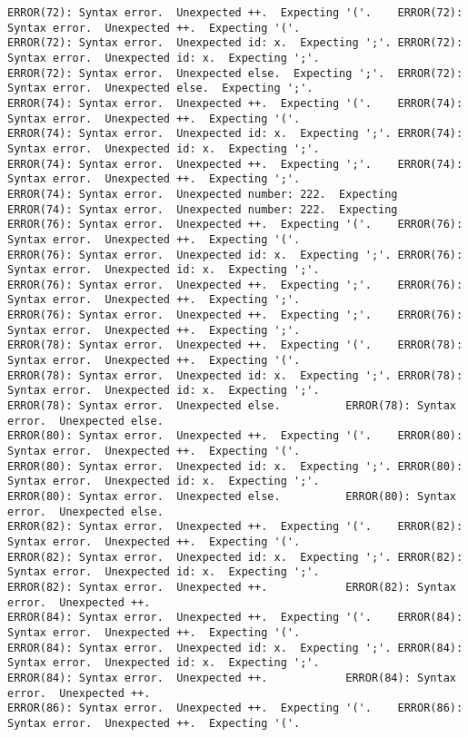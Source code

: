 \documentclass[12pt]{book}
\begin{document}
\begin{lstlisting}
ERROR(72): Syntax error.  Unexpected ++.  Expecting '('.	ERROR(72): Syntax error.  Unexpected ++.  Expecting '('.
ERROR(72): Syntax error.  Unexpected id: x.  Expecting ';'.	ERROR(72): Syntax error.  Unexpected id: x.  Expecting ';'.
ERROR(72): Syntax error.  Unexpected else.  Expecting ';'.	ERROR(72): Syntax error.  Unexpected else.  Expecting ';'.
ERROR(74): Syntax error.  Unexpected ++.  Expecting '('.	ERROR(74): Syntax error.  Unexpected ++.  Expecting '('.
ERROR(74): Syntax error.  Unexpected id: x.  Expecting ';'.	ERROR(74): Syntax error.  Unexpected id: x.  Expecting ';'.
ERROR(74): Syntax error.  Unexpected ++.  Expecting ';'.	ERROR(74): Syntax error.  Unexpected ++.  Expecting ';'.
ERROR(74): Syntax error.  Unexpected number: 222.  Expecting 	ERROR(74): Syntax error.  Unexpected number: 222.  Expecting 
ERROR(76): Syntax error.  Unexpected ++.  Expecting '('.	ERROR(76): Syntax error.  Unexpected ++.  Expecting '('.
ERROR(76): Syntax error.  Unexpected id: x.  Expecting ';'.	ERROR(76): Syntax error.  Unexpected id: x.  Expecting ';'.
ERROR(76): Syntax error.  Unexpected ++.  Expecting ';'.	ERROR(76): Syntax error.  Unexpected ++.  Expecting ';'.
ERROR(76): Syntax error.  Unexpected ++.  Expecting ';'.	ERROR(76): Syntax error.  Unexpected ++.  Expecting ';'.
ERROR(78): Syntax error.  Unexpected ++.  Expecting '('.	ERROR(78): Syntax error.  Unexpected ++.  Expecting '('.
ERROR(78): Syntax error.  Unexpected id: x.  Expecting ';'.	ERROR(78): Syntax error.  Unexpected id: x.  Expecting ';'.
ERROR(78): Syntax error.  Unexpected else.			ERROR(78): Syntax error.  Unexpected else.
ERROR(80): Syntax error.  Unexpected ++.  Expecting '('.	ERROR(80): Syntax error.  Unexpected ++.  Expecting '('.
ERROR(80): Syntax error.  Unexpected id: x.  Expecting ';'.	ERROR(80): Syntax error.  Unexpected id: x.  Expecting ';'.
ERROR(80): Syntax error.  Unexpected else.			ERROR(80): Syntax error.  Unexpected else.
ERROR(82): Syntax error.  Unexpected ++.  Expecting '('.	ERROR(82): Syntax error.  Unexpected ++.  Expecting '('.
ERROR(82): Syntax error.  Unexpected id: x.  Expecting ';'.	ERROR(82): Syntax error.  Unexpected id: x.  Expecting ';'.
ERROR(82): Syntax error.  Unexpected ++.			ERROR(82): Syntax error.  Unexpected ++.
ERROR(84): Syntax error.  Unexpected ++.  Expecting '('.	ERROR(84): Syntax error.  Unexpected ++.  Expecting '('.
ERROR(84): Syntax error.  Unexpected id: x.  Expecting ';'.	ERROR(84): Syntax error.  Unexpected id: x.  Expecting ';'.
ERROR(84): Syntax error.  Unexpected ++.			ERROR(84): Syntax error.  Unexpected ++.
ERROR(86): Syntax error.  Unexpected ++.  Expecting '('.	ERROR(86): Syntax error.  Unexpected ++.  Expecting '('.

\end{lstlisting}
\end{document}
